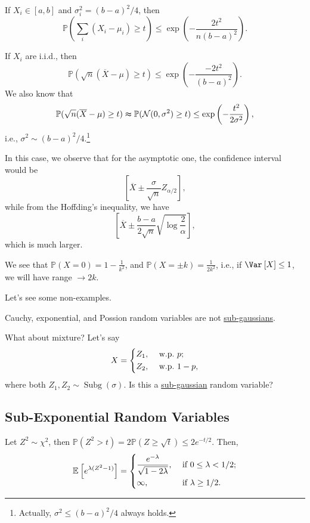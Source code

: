 \begin{corollary}
	If \(X_i \in [a, b]\) and \(\sigma _i^2 = (b-a)^2 / 4\), then
	\[
		\mathbb{P} \left( \sum_{i} (X_i - \mu _i) \geq t \right)  \leq \exp (- \frac{2t^{2} }{n(b-a)^2}).
	\]
\end{corollary}

\begin{remark}
	If \(X_i\) are i.i.d., then
	\[
		\mathbb{P} (\sqrt{n} (\overline{X} - \mu ) \geq t) \leq \exp \left( -\frac{-2t^{2} }{(b-a)^{2} } \right).
	\]
	We also know that
	\[
		\mathbb{P} (\sqrt{n} (\overline{X} - \mu ) \geq t) \thickapprox \mathbb{P} (\mathcal{N} (0, \sigma ^{2} ) \geq t)	 \leq \exp \left( - \frac{t^2}{2 \sigma ^{2} } \right) ,
	\]
	i.e., \(\sigma ^{2} \sim (b-a)^2 / 4\).\footnote{Actually, \(\sigma ^{2} \leq (b-a)^{2} / 4\) always holds.}

	In this case, we observe that for the asymptotic one, the confidence interval would be
	\[
		\left[  \overline{X} \pm  \frac{\sigma }{\sqrt{n}} Z_{\alpha / 2}\right],
	\]
	while from the Hoffding's inequality, we have
	\[
		\left[ \overline{X} \pm \frac{b-a}{2 \sqrt{n} } \sqrt{\log \frac{2}{\alpha }}  \right] ,
	\]
	which is much larger.
\end{remark}

We see that \(\mathbb{P} (X=0) = 1 - \frac{1}{k^2}\), and \(\mathbb{P} (X = \pm k) = \frac{1}{2k^{2} }\), i.e., if \(\Var_{}\left[X \right] \leq 1\), we will have range \(\to 2k\).

Let's see some non-examples.

\begin{eg}
	Cauchy, exponential, and Possion random variables are not \hyperref[def:sub-gaussian]{sub-gaussians}.
\end{eg}

\begin{problem*}
	What about mixture? Let's say
	\[
		X = \begin{dcases}
			Z_1, & \text{ w.p.\ } p ;   \\
			Z_2, & \text{ w.p.\ } 1-p ,
		\end{dcases}
	\]
	where both \(Z_1, Z_2\sim \mathop{\mathrm{Subg}}(\sigma ) \). Is this a \hyperref[def:sub-gaussian]{sub-gaussian} random variable?
\end{problem*}

\subsection{Sub-Exponential Random Variables}
Let \(Z^2 \sim \chi ^2\), then \(\mathbb{P} (Z^2 > t) = 2\mathbb{P} (Z \geq \sqrt{t} ) \leq 2 e^{-t / 2}\). Then,
\[
	\mathbb{E}_{}\left[e^{\lambda (Z^2 - 1)} \right] =
	\begin{dcases}
		\frac{e^{-\lambda }}{\sqrt{1 - 2 \lambda } }, & \text{ if } 0 \leq \lambda < 1 / 2 ; \\
		\infty ,                                      & \text{ if } \lambda  \geq 1 / 2 .
	\end{dcases}
\]

